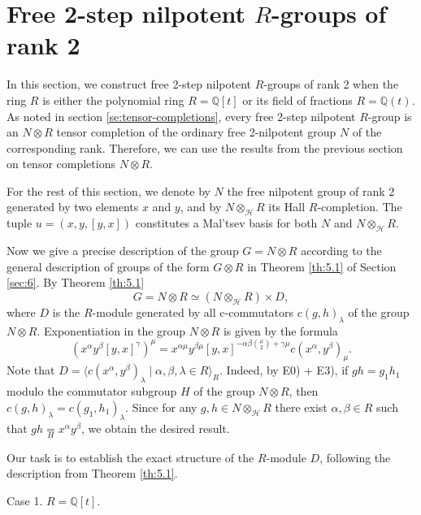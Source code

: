 \documentclass[11pt]{article}
\theoremstyle{definition}
\begin{document}
\section{Free 2-step nilpotent \texorpdfstring{$R$}{}-groups of rank 2}



In this section, we construct free 2-step nilpotent $R$-groups of rank 2 when the ring $R$ is either the polynomial ring $R=\mathbb{Q}[t]$ or its field of fractions $R=\mathbb{Q}(t)$. As noted in section \ref{se:tensor-completions}, every free 2-step nilpotent $R$-group is an $N\otimes R$ tensor completion of the ordinary free 2-nilpotent group $N$ of the corresponding rank. Therefore, we can use the results from the previous section on tensor completions $N \otimes R$.

For the rest of this section, we denote by $N$ the free nilpotent group of rank 2 generated by two elements $x$ and $y$, and by $N \otimes_{\mathcal{H}} R$ its Hall $R$-completion. The tuple $u = (x,y,[y,x])$ constitutes a Mal'tsev basis for both $N$ and $N \otimes_{\mathcal{H}} R$. 

Now we give a precise description of the group $G = N \otimes R$ according to the general description of groups of the form $G \otimes R$ in Theorem \ref{th:5.1} of Section \ref{sec:6}. By Theorem \ref{th:5.1} 
$$
G = N\otimes R \simeq (N \otimes_{\mathcal{H}} R) \times D,
$$
where $D$ is the $R$-module generated by all c-commutators $c(g,h)_\lambda$ of the group $N \otimes R$. Exponentiation in the group $N \otimes R$ is given by the formula
\begin{equation} \label{eq:exponentiation-new}
	  (x^\alpha y^\beta [y,x]^\gamma)^\mu = x^{\alpha\mu} y^{\beta\mu} [y,x]^{-\alpha \beta\binom{\mu}{2} +\gamma\mu} c(x^\alpha,y^\beta)_\mu.  
\end{equation}
Note that $D = \langle c(x^\alpha,y^\beta)_\lambda \mid \alpha, \beta, \lambda \in R \rangle_R$. Indeed, by E0) + E3), if $gh = g_1h_1$ modulo the commutator subgroup $H$ of the group $N\otimes R$, then $c(g,h)_\lambda =c(g_1,h_1)_\lambda$. Since for any $g,h \in N\otimes_{\mathcal{H}} R$ there exist $\alpha, \beta \in R$ such that $gh \underset{H}{=} x^\alpha y^\beta$, we obtain the desired result.

Our task is to establish the exact structure of the $R$-module $D$, following the description from Theorem \ref{th:5.1}.

\medskip
\noindent
Case 1.  $R= \mathbb{Q}[t]$.
\end{document}
